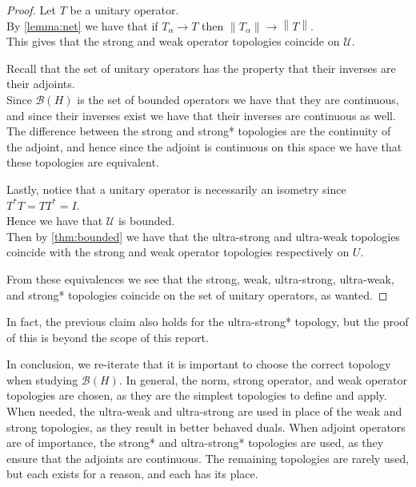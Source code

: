 \documentclass{article}
\theoremstyle{plain}
\theoremstyle{definition}
\newcommand{\norm}[1]{\left\lVert #1 \right\rVert}
\newcommand{\BH}{\cal{B}(H)}
\renewcommand{\cal}[1]{\mathcal{#1}}
\begin{document}
        \begin{proof}
                Let $T$ be a unitary operator.\\
                By \cref{lemma:net} we have that if $T_\alpha \to T$ then $\norm{T_\alpha} \to \norm{T}$.\\
                This gives that the strong and weak operator topologies coincide on $\cal{U}$.

                Recall that the set of unitary operators has the property that their inverses are their adjoints.\\
                Since $\BH$ is the set of bounded operators we have that they are continuous, and since their inverses exist we have that their inverses are continuous as well.\\
                The difference between the strong and strong* topologies are the continuity of the adjoint, and hence since the adjoint is continuous on this space we have that these topologies are equivalent.

                Lastly, notice that a unitary operator is necessarily an isometry since $T^*T = TT^* = I$.\\
                Hence we have that $\cal{U}$ is bounded.\\
                Then by \cref{thm:bounded} we have that the ultra-strong and ultra-weak topologies coincide with the strong and weak operator topologies respectively on $U$.

                From these equivalences we see that the strong, weak, ultra-strong, ultra-weak, and strong* topologies coincide on the set of unitary operators, as wanted.
        \end{proof}
        In fact, the previous claim also holds for the ultra-strong* topology, but the proof of this is beyond the scope of this report.

        In conclusion, we re-iterate that it is important to choose the correct topology when studying $\BH$.
        In general, the norm, strong operator, and weak operator topologies are chosen, as they are the simplest topologies to define and apply.
        When needed, the ultra-weak and ultra-strong are used in place of the weak and strong topologies, as they result in better behaved duals.
        When adjoint operators are of importance, the strong* and ultra-strong* topologies are used, as they ensure that the adjoints are continuous.
        The remaining topologies are rarely used, but each exists for a reason, and each has its place.
        
\end{document}
